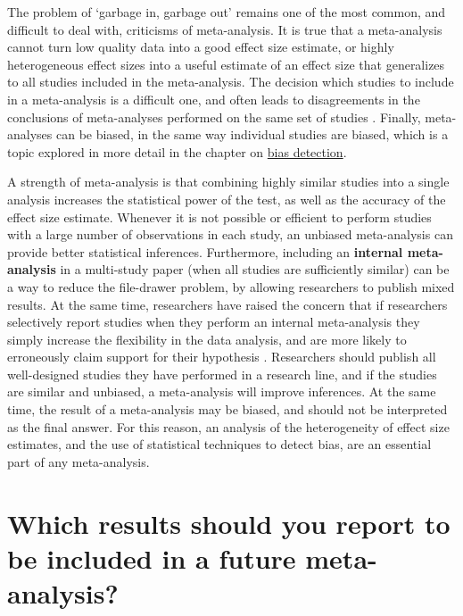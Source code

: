 \documentclass[
  oneside]{book}
\begin{document}
The problem of `garbage in, garbage out' remains one of the most common, and difficult to deal with, criticisms of meta-analysis. It is true that a meta-analysis cannot turn low quality data into a good effect size estimate, or highly heterogeneous effect sizes into a useful estimate of an effect size that generalizes to all studies included in the meta-analysis. The decision which studies to include in a meta-analysis is a difficult one, and often leads to disagreements in the conclusions of meta-analyses performed on the same set of studies \citep{goodyear-smith_analysis_2012, ferguson_comment_2014}. Finally, meta-analyses can be biased, in the same way individual studies are biased, which is a topic explored in more detail in the chapter on \protect\hyperlink{bias}{bias detection}.

A strength of meta-analysis is that combining highly similar studies into a single analysis increases the statistical power of the test, as well as the accuracy of the effect size estimate. Whenever it is not possible or efficient to perform studies with a large number of observations in each study, an unbiased meta-analysis can provide better statistical inferences. Furthermore, including an \textbf{internal meta-analysis} in a multi-study paper (when all studies are sufficiently similar) can be a way to reduce the file-drawer problem, by allowing researchers to publish mixed results. At the same time, researchers have raised the concern that if researchers selectively report studies when they perform an internal meta-analysis they simply increase the flexibility in the data analysis, and are more likely to erroneously claim support for their hypothesis \citep{vosgerau_99_2019}. Researchers should publish all well-designed studies they have performed in a research line, and if the studies are similar and unbiased, a meta-analysis will improve inferences. At the same time, the result of a meta-analysis may be biased, and should not be interpreted as the final answer. For this reason, an analysis of the heterogeneity of effect size estimates, and the use of statistical techniques to detect bias, are an essential part of any meta-analysis.

\hypertarget{which-results-should-you-report-to-be-included-in-a-future-meta-analysis}{%
\section{Which results should you report to be included in a future meta-analysis?}\label{which-results-should-you-report-to-be-included-in-a-future-meta-analysis}}
\end{document}
